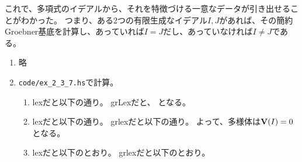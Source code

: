 \documentclass[9pt]{ltjsarticle}
\begin{document}
これで、多項式のイデアルから、それを特徴づける一意なデータが引き出せることがわかった。
つまり、ある2つの有限生成なイデアル$I,J$があれば、その簡約Groebner基底を計算し、あっていれば$I=J$だし、あっていなければ$I\neq J$である。

\begin{enumerate}[label=(問題\arabic*)]
  \item 略
  \item {\tt code/ex_2_3_7.hs}で計算。
  \begin{enumerate}[label=(\alph*)]
    \item lexだと以下の通り。
    grLexだと、
    となる。
    \item lexだと以下の通り。
    grlexだと以下の通り。
    よって、多様体は$\textbf V(I) = 0$となる。
    \item
    lexだと以下のとおり。
    grlexだと以下のとおり。
  \end{enumerate}
\end{enumerate}
\end{document}

